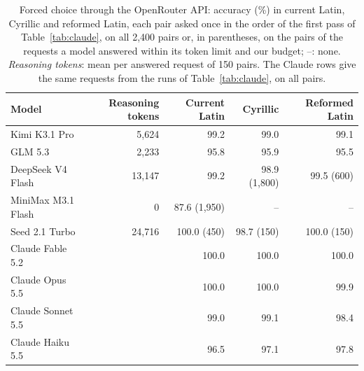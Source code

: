 \begin{table}[t]
\centering\small
\begin{tabular}{@{}lrrrr@{}}
\toprule
Model & Reasoning tokens & Current Latin & Cyrillic & Reformed Latin \\
\midrule
Kimi K3.1 Pro & 5,624 & 99.2 & 99.0 & 99.1 \\
GLM 5.3 & 2,233 & 95.8 & 95.9 & 95.5 \\
DeepSeek V4 Flash & 13,147 & 99.2 & 98.9 (1{,}800) & 99.5 (600) \\
MiniMax M3.1 Flash & 0 & 87.6 (1{,}950) & -- & -- \\
Seed 2.1 Turbo & 24,716 & 100.0 (450) & 98.7 (150) & 100.0 (150) \\
\midrule
Claude Fable 5.2 & & 100.0 & 100.0 & 100.0 \\
Claude Opus 5.5 & & 100.0 & 100.0 & 99.9 \\
Claude Sonnet 5.5 & & 99.0 & 99.1 & 98.4 \\
Claude Haiku 5.5 & & 96.5 & 97.1 & 97.8 \\
\bottomrule
\end{tabular}
\caption{Forced choice through the OpenRouter API: accuracy (\%) in current Latin{,} Cyrillic and reformed Latin{,} each pair asked once in the order of the first pass of Table~\ref{tab:claude}{,} on all 2{,}400 pairs or{,} in parentheses{,} on the pairs of the requests a model answered within its token limit and our budget; --: none. \emph{Reasoning tokens}: mean per answered request of 150 pairs. The Claude rows give the same requests from the runs of Table~\ref{tab:claude}, on all pairs.}
\label{tab:chat}
\end{table}
